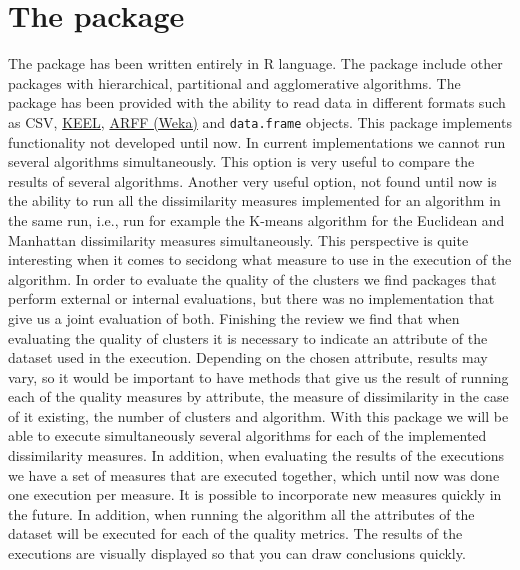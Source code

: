 \section {The  package} \label{sec:seccion3}
The  package has been written entirely in R language. The package include other packages with hierarchical, partitional and agglomerative algorithms. The package has been provided with the ability to read data in different formats such as CSV, \href{https://sci2s.ugr.es/keel/references.php}{KEEL}, \href{https://www.cs.waikato.ac.nz/ml/weka/}{ARFF (Weka)} and \texttt{data.frame} objects. This package implements functionality not developed until now. In current implementations we cannot run several algorithms simultaneously. This option is very useful to compare the results of several algorithms. Another very useful option, not found until now is the ability to run all the dissimilarity measures implemented for an algorithm in the same run, i.e., run for example the K-means algorithm for the Euclidean and Manhattan dissimilarity measures simultaneously. This perspective is quite interesting when it comes to secidong what measure to use in the execution of the algorithm. In order to evaluate the quality of the clusters we find packages that perform external or internal evaluations, but there was no implementation that give us a joint evaluation of both. Finishing the review we find that when evaluating the quality of clusters it is necessary to indicate an attribute of the dataset used in the execution. Depending on the chosen attribute, results may vary, so it would be important to have methods that give us the result of running each of the quality measures by attribute, the measure of dissimilarity in the case of it existing, the number of clusters and algorithm. With this  package we will be able to execute simultaneously several algorithms for each of the implemented dissimilarity measures. In addition, when evaluating the results of the executions we have a set of measures that are executed together, which until now was done one execution per measure. It is possible to incorporate new measures quickly in the future. In addition, when running the algorithm all the attributes of the dataset will be executed for each of the quality metrics. The results of the executions are visually displayed so that you can draw conclusions quickly.

